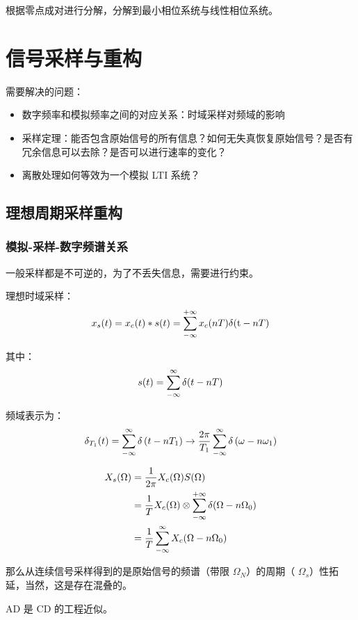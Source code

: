\documentclass[cn,11pt,chinese,black,simple]{elegantbook}
\begin{document}
根据零点成对进行分解，分解到最小相位系统与线性相位系统。


\chapter{信号采样与重构}

需要解决的问题： 

\begin{itemize}
    \item 数字频率和模拟频率之间的对应关系：时域采样对频域的影响
    \item 采样定理：能否包含原始信号的所有信息？如何无失真恢复原始信号？是否有冗余信息可以去除？是否可以进行速率的变化？
    \item 离散处理如何等效为一个模拟 LTI 系统？
\end{itemize}


\section{理想周期采样重构}

\subsection{模拟-采样-数字频谱关系}

一般采样都是不可逆的，为了不丢失信息，需要进行约束。

理想时域采样： \[x_{s}(t)=x_{c}(t) * s(t)=\displaystyle\sum_{-\infty}^{+\infty} x_{c}(n T) \delta(\mathrm{t}-n T)\]

其中：\[s(t) = \displaystyle\sum_{-\infty}^\infty \delta(t - n T)\] 

频域表示为： \[
    \delta_{T_{1}}(t)=\displaystyle\sum_{-\infty}^{\infty} \delta\left(t-n T_{1}\right) \rightarrow \dfrac{2\pi}{T_1} \displaystyle\sum_{-\infty}^{\infty} \delta\left(\omega-n \omega_{1}\right)
    \]

\[\begin{aligned}
    X_s(\Omega) &= \dfrac{1}{2\pi} X_c (\Omega) S(\Omega) \\ 
    &= \dfrac{1}{T} X_c(\Omega) \otimes \displaystyle\sum_{-\infty}^{+\infty} \delta(\Omega - n \Omega_0 ) \\ 
    &= \dfrac{1}{T} \displaystyle\sum_{-\infty}^\infty X_c(\Omega - n \Omega_0) 
\end{aligned}
\]

那么从连续信号采样得到的是原始信号的频谱（带限 \(\Omega_N\)）的周期（ \(\Omega_s\)）性拓延，当然，这是存在混叠的。

AD 是 CD 的工程近似。
\end{document}
